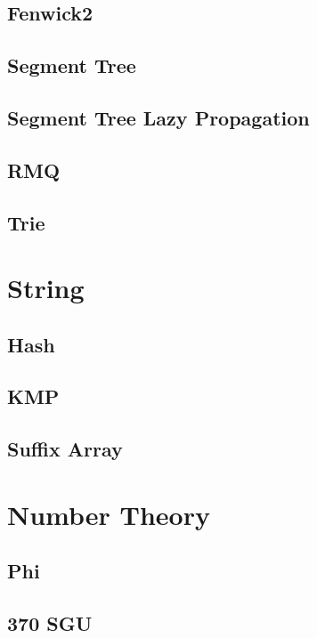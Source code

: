 \documentclass[a4paper,landscape]{article}
\begin{document}
\begin{multicols}{2}
\subsection{Fenwick2}
	
\subsection{Segment Tree}
	
\subsection{Segment Tree Lazy Propagation}
	
\subsection{RMQ}
	
\subsection{Trie}
	

\section{String}
\subsection{Hash}
	
\subsection{KMP}
	
\subsection{Suffix Array}
	

\section{Number Theory}
\subsection{Phi}
	
\subsection{370 SGU}
	

\end{multicols}
\end{document}
